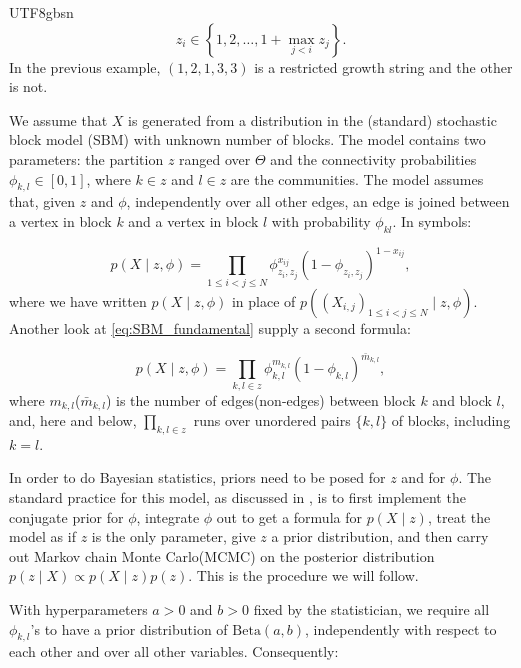 \documentclass[12pt]{report}
\newcommand{\bracket}[1]{\left ( #1 \right )}
\newcommand{\curly}[1]{\left \{ #1 \right \} }
\theoremstyle{plain}
\theoremstyle{definition}
\begin{document}
\begin{CJK*}{UTF8}{gbsn}
\begin{equation*}
  z_i \in \curly{1, 2, \ldots, 1 + \max_{j < i} z_j}.
\end{equation*}
In the previous example, $(1, 2, 1, 3, 3)$ is a
restricted growth string and the other is not.

We assume that $X$ is generated from a distribution 
in the (standard) stochastic block model (SBM)
with unknown number of blocks. 
The model contains two parameters: 
the partition $z$ ranged over $\Theta$
and the connectivity probabilities 
$\phi_{k,l} \in [0,1]$, 
where $k \in z$ and $l \in z$ are the communities.
The model assumes that, given $z$ and $\phi$,
independently over all other edges,
an edge is joined between a vertex in block $k$ 
and a vertex in block $l$ with probability $\phi_{kl}$.
In symbols:

\begin{equation}\label{eq:SBM_fundamental}
  p \bracket{X \mid z, \phi} = \prod_{1 \leqslant i < j \leqslant N} \phi_{z_i, z_j}^{x_{ij}} (1-\phi_{z_i, z_j})^{1-x_{ij}},
\end{equation}
where we have written $p \bracket{X \mid z, \phi}$ in place of 
$p \bracket{(X_{i,j})_{1 \leqslant i < j \leqslant N} \mid z, \phi}$.
Another look at \eqref{eq:SBM_fundamental}
supply a second formula:

\begin{equation}\label{eq:SBM_kl_with_phi}
  p \bracket{X \mid z, \phi} = \prod_{k, l \in z} \phi_{k, l}^{m_{k,l}} (1-\phi_{k, l})^{\bar{m}_{k,l}},
\end{equation}
where $m_{k,l}$($\bar{m}_{k,l}$) is the number of edges(non-edges) between block $k$ and block $l$,
and, here and below, $\prod_{k, l \in z}$ runs over unordered pairs $\{k, l\}$ of blocks, including $k = l$.

In order to do Bayesian statistics, 
priors need to be posed for $z$ and for $\phi$.
The standard practice for this model, as discussed in \cite{Schmidt_Morup_2013},
is to first implement the conjugate prior for $\phi$, 
integrate $\phi$ out to get a formula for $p \bracket{X \mid z}$,
treat the model as if $z$ is the only parameter, give $z$ a prior distribution,
and then carry out Markov chain Monte Carlo(MCMC)
on the posterior distribution $p(z \mid X) \propto p(X \mid z) p(z)$.
This is the procedure we will follow.

With hyperparameters $a > 0$ and $b > 0$ fixed by the statistician,
we require all $\phi_{k,l}$'s to have a prior distribution of $\text{Beta}(a,b)$,
independently with respect to each other and over all other variables.
Consequently:


\end{CJK*}
\end{document}
